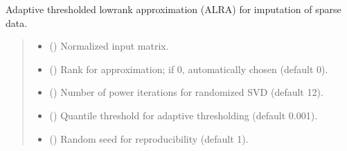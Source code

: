 \documentclass[letterpaper,10pt,english]{sphinxmanual}
\begin{document}
\begin{fulllineitems}
\label{\detokenize{core:pyALRA.core.alra}}
\pysigstartsignatures
\pysiglinewithargsret
{}
{\sphinxparamcomma {}\sphinxparamcomma {}\sphinxparamcomma {}\sphinxparamcomma {}\sphinxparamcomma {}}
{}
\pysigstopsignatures
\sphinxAtStartPar
Adaptive thresholded low\sphinxhyphen{}rank approximation (ALRA) for imputation of sparse data.
\begin{quote}\begin{description}
\begin{itemize}
\item {} 
\sphinxAtStartPar
{} () \textendash{} Normalized input matrix.

\item {} 
\sphinxAtStartPar
{} (\sphinxstyleliteralemphasis{\sphinxupquote{, }}) \textendash{} Rank for approximation; if 0, automatically chosen (default 0).

\item {} 
\sphinxAtStartPar
{} (\sphinxstyleliteralemphasis{\sphinxupquote{, }}) \textendash{} Number of power iterations for randomized SVD (default 12).

\item {} 
\sphinxAtStartPar
{} (\sphinxstyleliteralemphasis{\sphinxupquote{, }}) \textendash{} Quantile threshold for adaptive thresholding (default 0.001).

\item {} 
\sphinxAtStartPar
{} (\sphinxstyleliteralemphasis{\sphinxupquote{, }}) \textendash{} Random seed for reproducibility (default 1).


\end{itemize}
\end{description}
\end{quote}
\end{fulllineitems}
\end{document}
